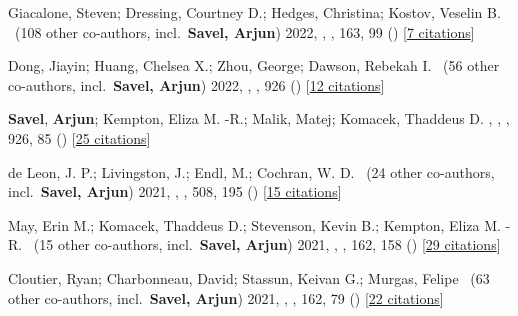 \item[{\color{numcolor}\scriptsize10}] Giacalone, Steven; Dressing, Courtney D.; Hedges, Christina; Kostov, Veselin B. \etal\ ({108} other co-authors, incl.\ \textbf{Savel, Arjun}) 2022, , \aj, {163}, 99 () [\href{https://ui.adsabs.harvard.edu/abs/2022AJ....163...99G}{7 citations}]

\item[{\color{numcolor}\scriptsize9}] Dong, Jiayin; Huang, Chelsea X.; Zhou, George; Dawson, Rebekah I. \etal\ ({56} other co-authors, incl.\ \textbf{Savel, Arjun}) 2022, , \apj, {926} () [\href{https://ui.adsabs.harvard.edu/abs/2022ApJ...926L...7D}{12 citations}]

\item[{\color{numcolor}\scriptsize8}] \textbf{Savel}, \textbf{Arjun}; Kempton, Eliza M. -R.; Malik, Matej; Komacek, Thaddeus D. , , \apj, {926}, 85 () [\href{https://ui.adsabs.harvard.edu/abs/2022ApJ...926...85S}{25 citations}]

\item[{\color{numcolor}\scriptsize7}] de Leon, J. P.; Livingston, J.; Endl, M.; Cochran, W. D. \etal\ ({24} other co-authors, incl.\ \textbf{Savel, Arjun}) 2021, , \mnras, {508}, 195 () [\href{https://ui.adsabs.harvard.edu/abs/2021MNRAS.508..195D}{15 citations}]

\item[{\color{numcolor}\scriptsize6}] May, Erin M.; Komacek, Thaddeus D.; Stevenson, Kevin B.; Kempton, Eliza M. -R. \etal\ ({15} other co-authors, incl.\ \textbf{Savel, Arjun}) 2021, , \aj, {162}, 158 () [\href{https://ui.adsabs.harvard.edu/abs/2021AJ....162..158M}{29 citations}]

\item[{\color{numcolor}\scriptsize5}] Cloutier, Ryan; Charbonneau, David; Stassun, Keivan G.; Murgas, Felipe \etal\ ({63} other co-authors, incl.\ \textbf{Savel, Arjun}) 2021, , \aj, {162}, 79 () [\href{https://ui.adsabs.harvard.edu/abs/2021AJ....162...79C}{22 citations}]

